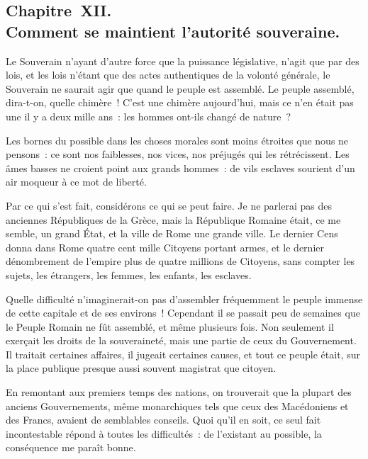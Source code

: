 \documentclass[french,twoside]{book} %
\begin{document}
\subsection[{Chapitre XII. Comment se maintient l’autorité souveraine.}]{Chapitre XII. \\
Comment se maintient l’autorité souveraine.}
\noindent Le Souverain n’ayant d’autre force que la puissance législative, n’agit que par des lois, et les lois n’étant que des actes authentiques de la volonté générale, le Souverain ne saurait agir que quand le peuple est assemblé. Le peuple assemblé, dira-t-on, quelle chimère ! C’est une chimère aujourd’hui, mais ce n’en était pas une il y a deux mille ans : les hommes ont-ils changé de nature ?\par
Les bornes du possible dans les choses morales sont moins étroites que nous ne pensons : ce sont nos faiblesses, nos vices, nos préjugés qui les rétrécissent. Les âmes basses ne croient point aux grands hommes : de vils esclaves sourient d’un air moqueur à ce mot de liberté.\par
Par ce qui s’est fait, considérons ce qui se peut faire. Je ne parlerai pas des anciennes Républiques de la Grèce, mais la République Romaine était, ce me semble, un grand État, et la ville de Rome une grande ville. Le dernier Cens donna dans Rome quatre cent mille Citoyens portant armes, et le dernier dénombrement de l’empire plus de quatre millions de Citoyens, sans compter les sujets, les étrangers, les femmes, les enfants, les esclaves.\par
Quelle difficulté n’imaginerait-on pas d’assembler fréquemment le peuple immense de cette capitale et de ses environs ! Cependant il se passait peu de semaines que le Peuple Romain ne fût assemblé, et même plusieurs fois. Non seulement il exerçait les droits de la souveraineté, mais une partie de ceux du Gouvernement. Il traitait certaines affaires, il jugeait certaines causes, et tout ce peuple était, sur la place publique presque aussi souvent magistrat que citoyen.\par
En remontant aux premiers temps des nations, on trouverait que la plupart des anciens Gouvernements, même monarchiques tels que ceux des Macédoniens et des Francs, avaient de semblables conseils. Quoi qu’il en soit, ce seul fait incontestable répond à toutes les difficultés : de l’existant au possible, la conséquence me paraît bonne.
\end{document}
